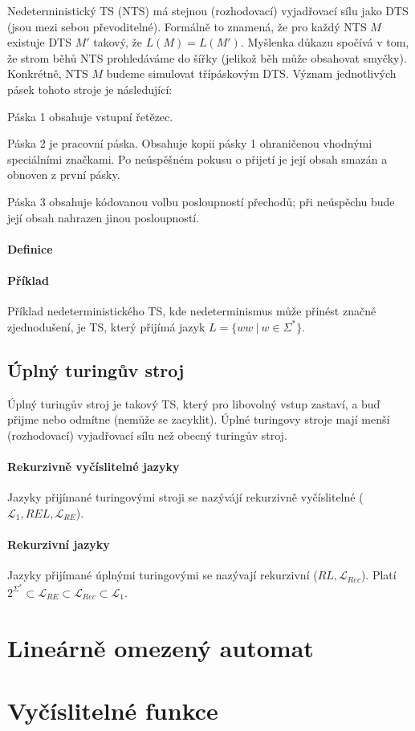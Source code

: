 Nedeterministický TS (NTS) má stejnou (rozhodovací) vyjadřovací sílu jako DTS (jsou mezi sebou převoditelné). Formálně to znamená, že pro každý NTS $M$ existuje DTS $M'$ takový, že $L(M) = L(M')$. Myšlenka důkazu spočívá v tom, že strom běhů NTS prohledáváme do šířky (jelikož běh může obsahovat smyčky). Konkrétně, NTS $M$ budeme simulovat třípáskovým DTS. Význam jednotlivých pásek tohoto
stroje je následující: \begin{compactitem}
    \item Páska 1 obsahuje vstupní řetězec.
    \item Páska 2 je pracovní páska. Obsahuje kopii pásky 1 ohraničenou vhodnými speciálními značkami. Po neúspěšném pokusu o přijetí je její obsah smazán a obnoven z první pásky.
    \item Páska 3 obsahuje kódovanou volbu posloupností přechodů; při neúspěchu bude její obsah nahrazen jinou posloupností.
\end{compactitem}

\paragraph*{Definice} 

\paragraph*{Příklad} Příklad nedeterministického TS, kde nedeterminismus může přinést značné zjednodušení, je TS, který přijímá jazyk $L = \{ ww ~|~ w \in \Sigma^* \}$.

\subsection{Úplný turingův stroj}

Úplný turingův stroj je takový TS, který pro libovolný vstup zastaví, a buď přijme nebo odmítne (nemůže se zacyklit). Úplné turingovy stroje mají menší (rozhodovací) vyjadřovací sílu než obecný turingův stroj.

\paragraph*{Rekurzivně vyčíslitelné jazyky} Jazyky přijímané turingovými stroji se nazývájí rekurzivně vyčíslitelné ($\mathcal{L}_1, REL, \mathcal{L}_{RE}$).

\paragraph*{Rekurzivní jazyky} Jazyky přijímané úplnými turingovými se nazývají rekurzivní ($RL, \mathcal{L}_{Rec}$). Platí $2^{\Sigma^*} \subset \mathcal{L}_{RE} \subset \mathcal{L}_{Rec} \subset \mathcal{L}_1$.


\section{Lineárně omezený automat}



\section{Vyčíslitelné funkce}

